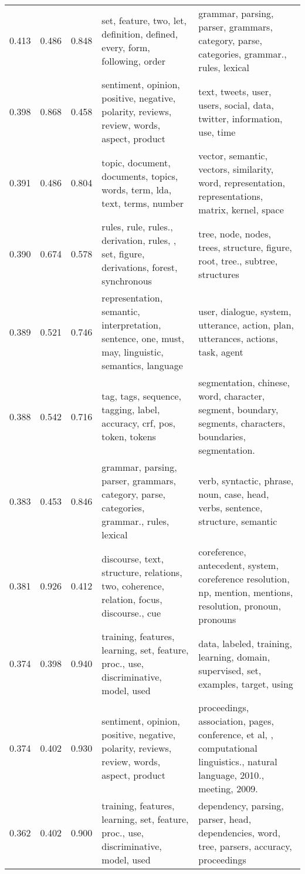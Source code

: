 \begin{tabular}{cccp{5cm}p{5cm}}
0.413 & 0.486 & 0.848 & set, feature, two, let, definition, defined, every, form, following, order & grammar, parsing, parser, grammars, category, parse, categories, grammar., rules, lexical \\
0.398 & 0.868 & 0.458 & sentiment, opinion, positive, negative, polarity, reviews, review, words, aspect, product & text, tweets, user, users, social, data, twitter, information, use, time \\
0.391 & 0.486 & 0.804 & topic, document, documents, topics, words, term, lda, text, terms, number & vector, semantic, vectors, similarity, word, representation, representations, matrix, kernel, space \\
0.390 & 0.674 & 0.578 & rules, rule, rules., derivation, rules, , set, figure, derivations, forest, synchronous & tree, node, nodes, trees, structure, figure, root, tree., subtree, structures \\
0.389 & 0.521 & 0.746 & representation, semantic, interpretation, sentence, one, must, may, linguistic, semantics, language & user, dialogue, system, utterance, action, plan, utterances, actions, task, agent \\
0.388 & 0.542 & 0.716 & tag, tags, sequence, tagging, label, accuracy, crf, pos, token, tokens & segmentation, chinese, word, character, segment, boundary, segments, characters, boundaries, segmentation. \\
0.383 & 0.453 & 0.846 & grammar, parsing, parser, grammars, category, parse, categories, grammar., rules, lexical & verb, syntactic, phrase, noun, case, head, verbs, sentence, structure, semantic \\
0.381 & 0.926 & 0.412 & discourse, text, structure, relations, two, coherence, relation, focus, discourse., cue & coreference, antecedent, system, coreference resolution, np, mention, mentions, resolution, pronoun, pronouns \\
0.374 & 0.398 & 0.940 & training, features, learning, set, feature, proc., use, discriminative, model, used & data, labeled, training, learning, domain, supervised, set, examples, target, using \\
0.374 & 0.402 & 0.930 & sentiment, opinion, positive, negative, polarity, reviews, review, words, aspect, product & proceedings, association, pages, conference, et al, , computational linguistics., natural language, 2010., meeting, 2009. \\
0.362 & 0.402 & 0.900 & training, features, learning, set, feature, proc., use, discriminative, model, used & dependency, parsing, parser, head, dependencies, word, tree, parsers, accuracy, proceedings \\

\end{tabular}

